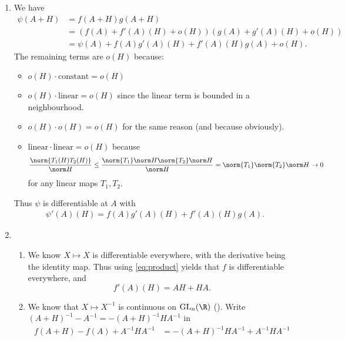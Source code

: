 \documentclass[12pt]{article}
\begin{document}
\begin{solution} \leavevmode
    \begin{enumerate}
        \item We have \begin{align*}
            \psi(A + H) &= f(A + H)g(A + H) \\
            &= (f(A) + f'(A)(H) + o(H))(g(A) + g'(A)(H) + o(H)) \\
            &= \psi(A) + f(A)g'(A)(H) + f'(A)(H)g(A) + o(H).
        \end{align*}
        The remaining terms are $o(H)$ because:
        \begin{itemize}
            \item $o(H) \cdot \text{constant} = o(H)$
            \item $o(H) \cdot \text{linear} = o(H)$ since
            the linear term is bounded in a neighbourhood.
            \item $o(H) \cdot o(H) = o(H)$ for the same reason
            (and because obviously).
            \item $\text{linear} \cdot \text{linear} = o(H)$ because \[
                \frac{\norm{T_1(H) T_2(H)}}{\norm H}
                \le \frac{\norm{T_1} \norm H \norm{T_2} \norm H}{\norm H}
                = \norm{T_1} \norm{T_2} \norm H \to 0
            \] for any linear maps $T_1, T_2$.
        \end{itemize}
        Thus $\psi$ is differentiable at $A$ with \begin{align*}
            \psi'(A)(H) = f(A)g'(A)(H) + f'(A)(H)g(A).
            \tag{$*$} \label{eq:product}
        \end{align*}
        \item
        \begin{enumerate}
            \item We know $X \mapsto X$ is differentiable everywhere, with
            the derivative being the identity map.
            Thus using \eqref{eq:product} yields that $f$ is
            differentiable everywhere, and \[
                f'(A)(H) = AH + HA.
            \]
            \item We know that $X \mapsto X^{-1}$ is continuous on
            $\GL_n(\R)$ ().
            Write $(A + H)^{-1} - A^{-1} = -(A + H)^{-1}H A^{-1}$ in
            \begin{align*}
                f(A + H) - f(A) + A^{-1}HA^{-1}
                &= -(A + H)^{-1}H A^{-1} + A^{-1}HA^{-1} \\

\end{align*}
\end{enumerate}
\end{enumerate}
\end{solution}
\end{document}
